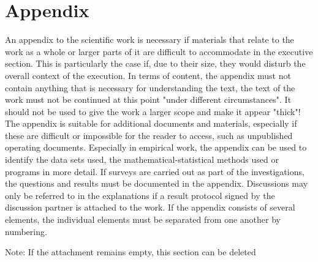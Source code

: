 \section{Appendix}
\renewcommand{\thepage}{A-\arabic{page}}  %
\setcounter{page}{1}  %

An appendix to the scientific work is necessary if materials that relate to the work as a whole or larger parts of it are difficult to accommodate in the executive section. This is particularly the case if, due to their size, they would disturb the overall context of the execution. In terms of content, the appendix must not contain anything that is necessary for understanding the text, the text of the work must not be continued at this point "under different circumstances". It should not be used to give the work a larger scope and make it appear "thick"!
The appendix is suitable for additional documents and materials, especially if these are difficult or impossible for the reader to access, such as unpublished operating documents.
Especially in empirical work, the appendix can be used to identify the data sets used, the mathematical-statistical methods used or programs in more detail. If surveys are carried out as part of the investigations, the questions and results must be documented in the appendix. Discussions may only be referred to in the explanations if a result protocol signed by the discussion partner is attached to the work.
If the appendix consists of several elements, the individual elements must be separated from one another by numbering.

Note: If the attachment remains empty, this section can be deleted
